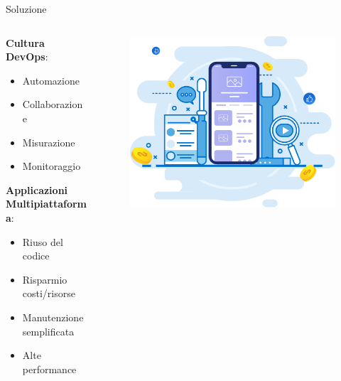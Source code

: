 \begin{frame}{Soluzione}
    \begin{columns}[onlytextwidth,t]
        \begin{column}{0.45\textwidth}
    
            \textbf{Cultura DevOps}:
            \begin{itemize}
                \item Automazione
                \item Collaborazione
                \item Misurazione
                \item Monitoraggio
            \end{itemize}

            \vspace{4mm}
        
            \textbf{Applicazioni\\Multipiattaforma}:
            \begin{itemize}
                \item Riuso del codice
                \item Risparmio costi/risorse
                \item Manutenzione semplificata
                \item Alte performance
            \end{itemize}
            
        \end{column}
        \begin{column}{0.55\textwidth}

            \begin{figure}[H]
                \includegraphics[width=1\textwidth]{img/devops-mobile.png}
            \end{figure}
        
        \end{column}
    \end{columns}
\end{frame}